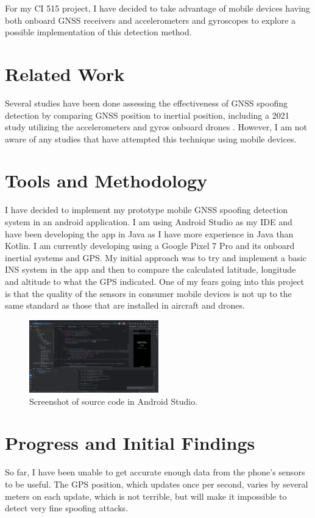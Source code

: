 \documentclass[conference]{IEEEtran}
\begin{document}
For my CI 515 project, I have decided to take advantage of mobile devices having both onboard GNSS receivers and accelerometers and gyroscopes to explore a possible implementation of this detection method.

\section{Related Work}
Several studies have been done assessing the effectiveness of GNSS spoofing detection by comparing GNSS position to inertial position, including a 2021 study utilizing the accelerometers and gyros onboard drones \cite{meng2021}. However, I am not aware of any studies that have attempted this technique using mobile devices.

\section{Tools and Methodology}
I have decided to implement my prototype mobile GNSS spoofing detection system in an android application.  I am using Android Studio as my IDE and have been developing the app in Java as I have more experience in Java than Kotlin.  I am currently developing using a Google Pixel 7 Pro and its onboard inertial systems and GPS.  My initial approach was to try and implement a basic INS system in the app and then to compare the calculated latitude, longitude and altitude to what the GPS indicated.  One of my fears going into this project is that the quality of the sensors in consumer mobile devices is not up to the same standard as those that are installed in aircraft and drones.

\begin{figure}[htbp]
    \centerline{\includegraphics[width=0.5\textwidth]{figs/android_studio.png}}
    \caption{Screenshot of source code in Android Studio.}
\end{figure}

\section{Progress and Initial Findings}
So far, I have been unable to get accurate enough data from the phone’s sensors to be useful.  The GPS position, which updates once per second, varies by several meters on each update, which is not terrible, but will make it impossible to detect very fine spoofing attacks.  
\end{document}

